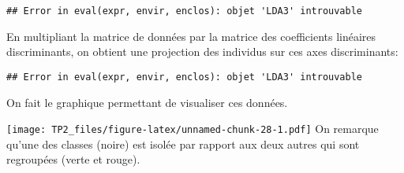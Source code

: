 \documentclass[
]{article}
\newenvironment{Shaded}{\begin{snugshade}}{\end{snugshade}}
\newcommand{\DataTypeTok}[1]{\textcolor[rgb]{0.13,0.29,0.53}{#1}}
\newcommand{\DecValTok}[1]{\textcolor[rgb]{0.00,0.00,0.81}{#1}}
\newcommand{\KeywordTok}[1]{\textcolor[rgb]{0.13,0.29,0.53}{\textbf{#1}}}
\newcommand{\NormalTok}[1]{#1}
\newcommand{\OperatorTok}[1]{\textcolor[rgb]{0.81,0.36,0.00}{\textbf{#1}}}
\newcommand{\StringTok}[1]{\textcolor[rgb]{0.31,0.60,0.02}{#1}}
\begin{document}
\begin{verbatim}
## Error in eval(expr, envir, enclos): objet 'LDA3' introuvable
\end{verbatim}

En multipliant la matrice de données par la matrice des coefficients
linéaires discriminants, on obtient une projection des individus sur ces
axes discriminants:

\begin{Shaded}
\end{Shaded}

\begin{verbatim}
## Error in eval(expr, envir, enclos): objet 'LDA3' introuvable
\end{verbatim}

On fait le graphique permettant de visualiser ces données.

\begin{Shaded}
\end{Shaded}

\texttt{[image: TP2\_files/figure-latex/unnamed-chunk-28-1.pdf]} On
remarque qu'une des classes (noire) est isolée par rapport aux deux
autres qui sont regroupées (verte et rouge).
\end{document}
